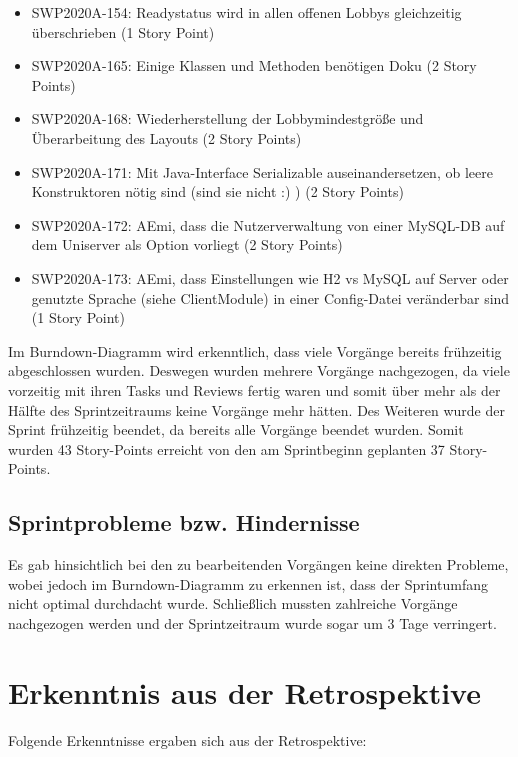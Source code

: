 \documentclass[12pt,a4paper, oneside]{article}
\begin{document}
    \begin{itemize}
        \item SWP2020A-154: Readystatus wird in allen offenen Lobbys gleichzeitig überschrieben    (1 Story Point)

        \item SWP2020A-165: Einige Klassen und Methoden benötigen Doku (2 Story Points)

        \item SWP2020A-168: Wiederherstellung der Lobbymindestgröße und Überarbeitung des Layouts (2 Story Points)

        \item SWP2020A-171: Mit Java-Interface Serializable auseinandersetzen, ob leere Konstruktoren nötig sind (sind sie nicht :) )    (2 Story Points)

        \item SWP2020A-172: AEmi, dass die Nutzerverwaltung von einer MySQL-DB auf dem Uniserver als Option vorliegt (2 Story Points)


        \item SWP2020A-173: AEmi, dass Einstellungen wie H2 vs MySQL auf Server oder genutzte Sprache (siehe ClientModule) in einer Config-Datei veränderbar sind (1 Story Point)

    \end{itemize}

    \noindent
    Im Burndown-Diagramm wird erkenntlich, dass viele Vorgänge bereits frühzeitig abgeschlossen wurden. Deswegen wurden mehrere Vorgänge nachgezogen, da viele vorzeitig mit ihren Tasks und Reviews fertig waren und somit über mehr als der Hälfte des Sprintzeitraums keine Vorgänge mehr hätten. Des Weiteren wurde der Sprint frühzeitig beendet, da bereits alle Vorgänge beendet wurden. Somit wurden 43 Story-Points erreicht von den am Sprintbeginn geplanten 37 Story-Points.

    \subsection{Sprintprobleme bzw. Hindernisse}
    Es gab hinsichtlich bei den zu bearbeitenden Vorgängen keine direkten Probleme, wobei jedoch im Burndown-Diagramm zu erkennen ist, dass der Sprintumfang nicht optimal durchdacht wurde.
    \noindent
    Schließlich mussten zahlreiche Vorgänge nachgezogen werden und der Sprintzeitraum wurde sogar um 3 Tage verringert.


    \section{Erkenntnis aus der Retrospektive}
    Folgende Erkenntnisse ergaben sich aus der Retrospektive:\\
\end{document}
